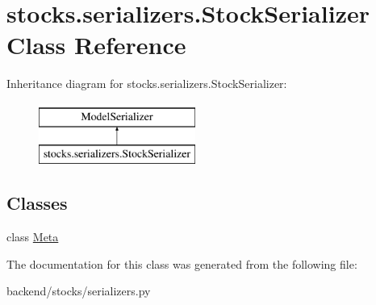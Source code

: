 \hypertarget{classstocks_1_1serializers_1_1_stock_serializer}{}\section{stocks.\+serializers.\+Stock\+Serializer Class Reference}
\label{classstocks_1_1serializers_1_1_stock_serializer}
Inheritance diagram for stocks.\+serializers.\+Stock\+Serializer\+:\begin{figure}[H]
\begin{center}
\leavevmode
\includegraphics[height=2.000000cm]{classstocks_1_1serializers_1_1_stock_serializer}
\end{center}
\end{figure}
\subsection*{Classes}
\begin{DoxyCompactItemize}
\item 
class \mbox{\hyperlink{classstocks_1_1serializers_1_1_stock_serializer_1_1_meta}{Meta}}
\end{DoxyCompactItemize}


The documentation for this class was generated from the following file\+:\begin{DoxyCompactItemize}
\item 
backend/stocks/serializers.\+py\end{DoxyCompactItemize}
